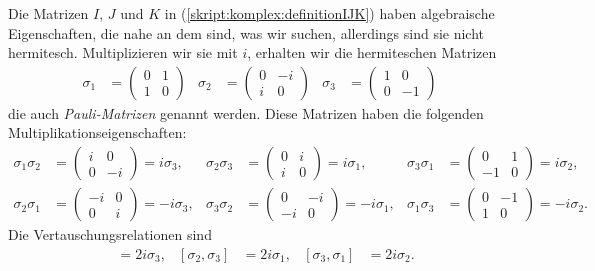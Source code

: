 Die Matrizen $I$, $J$ und $K$ in (\ref{skript:komplex:definitionIJK}) haben
algebraische Eigenschaften, die nahe an dem sind, was wir suchen,
allerdings sind sie nicht hermitesch.
Multiplizieren wir sie mit $i$, erhalten wir die hermiteschen Matrizen
\begin{align}
\sigma_1
&=
\begin{pmatrix}
0&1\\1&0
\end{pmatrix}
&
\sigma_2
&=
\begin{pmatrix}
0&-i\\i&0
\end{pmatrix}
&
\sigma_3
&=
\begin{pmatrix}
1&0\\0&-1
\end{pmatrix}
\label{spin:paulimatrizen}
\end{align}
%
%
die auch {\em Pauli-Matrizen} genannt werden.
Diese Matrizen haben die folgenden Multiplikationseigenschaften:
\begin{align*}
\sigma_1\sigma_2
&=
\begin{pmatrix} i&0\\0&-i \end{pmatrix} = i\sigma_3,
&
\sigma_2\sigma_3
&=
\begin{pmatrix} 0&i\\i&0 \end{pmatrix} = i\sigma_1,
&
\sigma_3\sigma_1
&=
\begin{pmatrix} 0&1\\-1&0 \end{pmatrix} = i\sigma_2,
\\
\sigma_2\sigma_1
&=
\begin{pmatrix} -i&0\\0&i \end{pmatrix} = -i\sigma_3,
&
\sigma_3\sigma_2
&=
\begin{pmatrix} 0&-i\\-i&0 \end{pmatrix} = -i\sigma_1,
&
\sigma_1\sigma_3
&=
\begin{pmatrix} 0&-1\\1&0 \end{pmatrix} = -i\sigma_2.
\end{align*}
%
Die Vertauschungsrelationen sind
\begin{align*}
[\sigma_1,\sigma_2]
&=
2i\sigma_3,
&
[\sigma_2,\sigma_3]
&=
2i\sigma_1,
&
[\sigma_3,\sigma_1]
&=
2i\sigma_2.
\end{align*}
